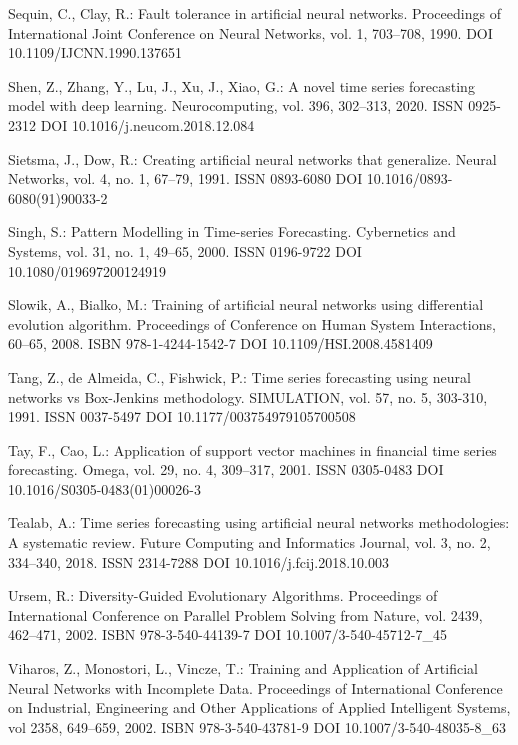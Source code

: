 \begin{thebibliography}{99.}
 Sequin, C., Clay, R.: Fault tolerance in artificial neural networks. Proceedings of International Joint Conference on Neural Networks, vol. 1, 703--708, 1990. DOI 10.1109/IJCNN.1990.137651

 Shen, Z., Zhang, Y., Lu, J., Xu, J., Xiao, G.: A novel time series forecasting model with deep learning. Neurocomputing, vol. 396, 302--313, 2020. ISSN 0925-2312 DOI 10.1016/j.neucom.2018.12.084

 Sietsma, J., Dow, R.: Creating artificial neural networks that generalize. Neural Networks, vol. 4, no. 1, 67--79, 1991. ISSN 0893-6080 DOI 10.1016/0893-6080(91)90033-2

 Singh, S.: Pattern Modelling in Time-series Forecasting. Cybernetics and Systems, vol. 31, no. 1, 49--65, 2000. ISSN 0196-9722 DOI 10.1080/019697200124919

 Slowik, A., Bialko, M.: Training of artificial neural networks using differential evolution algorithm. Proceedings of Conference on Human System Interactions, 60--65, 2008. ISBN 978-1-4244-1542-7 DOI 10.1109/HSI.2008.4581409

 Tang, Z., de Almeida, C., Fishwick, P.: Time series forecasting using neural networks vs Box-Jenkins methodology. SIMULATION, vol. 57, no. 5, 303-310, 1991. ISSN 0037-5497 DOI 10.1177/003754979105700508

 Tay, F., Cao, L.: Application of support vector machines in financial time series forecasting. Omega, vol. 29, no. 4, 309--317, 2001. ISSN 0305-0483 DOI 10.1016/S0305-0483(01)00026-3

 Tealab, A.: Time series forecasting using artificial neural networks methodologies: A systematic review. Future Computing and Informatics Journal, vol. 3, no. 2, 334--340, 2018. ISSN 2314-7288 DOI 10.1016/j.fcij.2018.10.003

 Ursem, R.: Diversity-Guided Evolutionary Algorithms. Proceedings of International Conference on Parallel Problem Solving from Nature, vol. 2439, 462--471, 2002. ISBN 978-3-540-44139-7 DOI 10.1007/3-540-45712-7\_45

 Viharos, Z., Monostori, L., Vincze, T.: Training and Application of Artificial Neural Networks with Incomplete Data. Proceedings of International Conference on Industrial, Engineering and Other Applications of Applied Intelligent Systems, vol 2358, 649--659, 2002. ISBN 978-3-540-43781-9 DOI 10.1007/3-540-48035-8\_63


\end{thebibliography}
